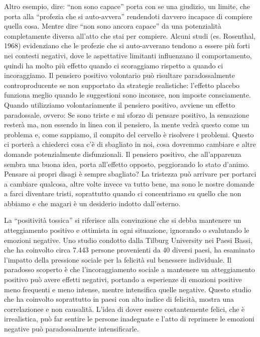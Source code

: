 \documentclass[12pt]{book} %
\begin{document}
Altro esempio, dire: “non sono capace” porta con se una giudizio, un limite, che porta alla “profezia che si
auto-avvera” rendendoti davvero incapace di compiere quella cosa. Mentre dire “non sono ancora capace” da una
potenzialità completamente diversa all'atto che stai per compiere. Alcuni studi (es. Rosenthal, 1968) evidenziano che le profezie che si auto-avverano tendono a essere più forti nei contesti negativi, dove le aspettative limitanti influenzano il comportamento, quindi ha molto più effetto quando ci scoraggiamo rispetto a quando ci incoraggiamo. Il pensiero positivo volontario può risultare paradossalmente controproducente se non supportato da strategie realistiche: l’effetto placebo funziona meglio quando le suggestioni sono inconsce, non imposte consciamente. Quando utilizziamo
volontariamente il pensiero positivo, avviene un effetto paradossale, ovvero: Se sono triste e mi sforzo di pensare
positivo, la sensazione resterà ma, non essendo in linea con il pensiero, la mente vedrà questo come un problema e,
come sappiamo, il compito del cervello è risolvere i problemi. Questo ci porterà a chiederci cosa
c'è di sbagliato in noi, cosa dovremmo cambiare e altre domande potenzialmente disfunzionali. Il
pensiero positivo, che all'apparenza sembra una buona idea, porta all'effetto
opposto, peggiorando lo stato d'animo. Pensare ai propri disagi è sempre sbagliato? La tristezza può arrivare per portarci a cambiare qualcosa, altre
volte invece va tutto bene, ma sono le nostre domande a farci diventare tristi, soprattutto quando ci concentriamo su
quello che non abbiamo e che magari è un desiderio indotto dall'esterno.

La “positività tossica” si riferisce alla convinzione che si debba mantenere un atteggiamento positivo e ottimista in ogni situazione, ignorando o svalutando le emozioni negative. Uno studio condotto dalla Tilburg University nei Paesi Bassi, che ha coinvolto circa 7.443 persone provenienti da 40 diversi paesi, ha esaminato l’impatto della pressione sociale per la felicità sul benessere individuale.
Il paradosso scoperto è che l’incoraggiamento sociale a mantenere un atteggiamento positivo può avere effetti negativi, portando a esperienze di emozioni positive meno frequenti e meno intense, mentre intensifica quelle negative. Questo studio che ha coinvolto soprattutto in paesi con alto indice di felicità, mostra una correlazionee e non causalità. L’idea di dover essere costantemente felici, che è irrealistica, può far sentire le persone inadeguate e l’atto di reprimere le emozioni negative può paradossalmente intensificarle.
\end{document}

